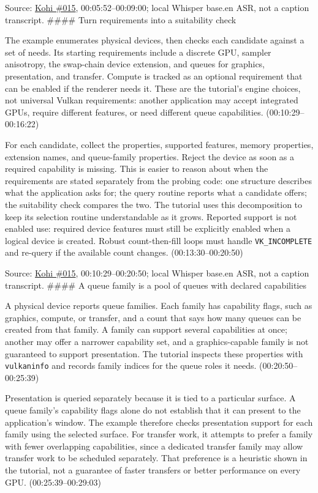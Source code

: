 Source: \href{https://www.youtube.com/watch?v=6Kj3O2Ov1RU}{Kohi \#015}, 00:05:52--00:09:00; local Whisper base.en ASR, not a caption transcript. \#\#\#\# Turn requirements into a suitability check

The example enumerates physical devices, then checks each candidate against a set of needs. Its starting requirements include a discrete GPU, sampler anisotropy, the swap-chain device extension, and queues for graphics, presentation, and transfer. Compute is tracked as an optional requirement that can be enabled if the renderer needs it. These are the tutorial's engine choices, not universal Vulkan requirements: another application may accept integrated GPUs, require different features, or need different queue capabilities. (00:10:29--00:16:22)

For each candidate, collect the properties, supported features, memory properties, extension names, and queue-family properties. Reject the device as soon as a required capability is missing. This is easier to reason about when the requirements are stated separately from the probing code: one structure describes what the application asks for; the query routine reports what a candidate offers; the suitability check compares the two. The tutorial uses this decomposition to keep its selection routine understandable as it grows. Reported support is not enabled use: required device features must still be explicitly enabled when a logical device is created. Robust count-then-fill loops must handle \texttt{VK\_INCOMPLETE} and re-query if the available count changes. (00:13:30--00:20:50)

Source: \href{https://www.youtube.com/watch?v=6Kj3O2Ov1RU}{Kohi \#015}, 00:10:29--00:20:50; local Whisper base.en ASR, not a caption transcript. \#\#\#\# A queue family is a pool of queues with declared capabilities

A physical device reports queue families. Each family has capability flags, such as graphics, compute, or transfer, and a count that says how many queues can be created from that family. A family can support several capabilities at once; another may offer a narrower capability set, and a graphics-capable family is not guaranteed to support presentation. The tutorial inspects these properties with \texttt{vulkaninfo} and records family indices for the queue roles it needs. (00:20:50--00:25:39)

Presentation is queried separately because it is tied to a particular surface. A queue family's capability flags alone do not establish that it can present to the application's window. The example therefore checks presentation support for each family using the selected surface. For transfer work, it attempts to prefer a family with fewer overlapping capabilities, since a dedicated transfer family may allow transfer work to be scheduled separately. That preference is a heuristic shown in the tutorial, not a guarantee of faster transfers or better performance on every GPU. (00:25:39--00:29:03)

